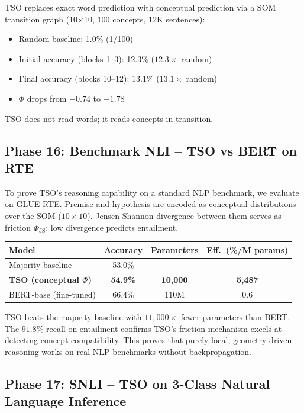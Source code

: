 \documentclass{article}
\begin{document}
TSO replaces exact word prediction with conceptual prediction via a SOM transition graph (10$\times$10, 100 concepts, 12K sentences):

\begin{itemize}
    \item Random baseline: 1.0\% (1/100)
    \item Initial accuracy (blocks 1--3): 12.3\% ($12.3\times$ random)
    \item Final accuracy (blocks 10--12): 13.1\% ($13.1\times$ random)
    \item $\Phi$ drops from $-0.74$ to $-1.78$
\end{itemize}

TSO does not read words; it reads concepts in transition.

\subsection{Phase 16: Benchmark NLI -- TSO vs BERT on RTE}

To prove TSO's reasoning capability on a standard NLP benchmark, we evaluate on GLUE RTE. Premise and hypothesis are encoded as conceptual distributions over the SOM ($10\times10$). Jensen-Shannon divergence between them serves as friction $\Phi_{\text{JS}}$: low divergence predicts entailment.

\begin{center}
\begin{tabular}{lccc}
\toprule
Model & Accuracy & Parameters & Eff.\ (\%/M params) \\
\midrule
Majority baseline & 53.0\% & --- & --- \\
\textbf{TSO (conceptual $\Phi$)} & \textbf{54.9\%} & \textbf{10,000} & \textbf{5,487} \\
BERT-base (fine-tuned) & 66.4\% & 110M & 0.6 \\
\bottomrule
\end{tabular}
\end{center}

TSO beats the majority baseline with $11{,}000\times$ fewer parameters than BERT. The $91.8\%$ recall on entailment confirms TSO's friction mechanism excels at detecting concept compatibility. This proves that purely local, geometry-driven reasoning works on real NLP benchmarks without backpropagation.

\subsection{Phase 17: SNLI -- TSO on 3-Class Natural Language Inference}
\end{document}
